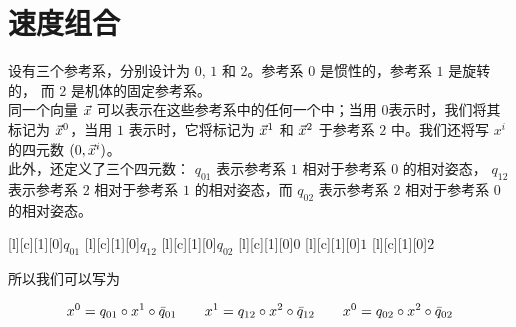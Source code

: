%
%


%

%

%

%





\section{速度组合}
\label{SpeedComposition}


设有三个参考系，分别设计为 $0$, $1$ 和 $2$。参考系 $0$ 是惯性的，参考系 $1$ 是旋转的， 而 $2$ 是机体的固定参考系。\\
同一个向量 $\vec{x}$ 可以表示在这些参考系中的任何一个中；当用 $0$表示时，我们将其标记为 $\vec{x}^0$，当用 $1$ 表示时，它将标记为 $\vec{x}^1$ 和 $\vec{x}^2$ 于参考系 $2$ 中。我们还将写 $x^i$ 的四元数 $(0,\vec{x}^i)$。\\
此外，还定义了三个四元数： $q_{01}$ 表示参考系 $1$ 相对于参考系 $0$ 的相对姿态， $q_{12}$ 表示参考系 $2$ 相对于参考系 $1$ 的相对姿态，而 $q_{02}$ 表示参考系 $2$ 相对于参考系 $0$的相对姿态。\\


\begin{center}
[l][c][1][0]{$q_{01}$}
[l][c][1][0]{$q_{12}$}
[l][c][1][0]{$q_{02}$}
[l][c][1][0]{$0$}
[l][c][1][0]{$1$}
[l][c][1][0]{$2$}
\end{center}


所以我们可以写为

\begin{equation*}
x^0=q_{01} \circ x^1 \circ \bar{q}_{01}   \qquad   x^1=q_{12} \circ x^2 \circ \bar{q}_{12} \qquad    x^0=q_{02} \circ x^2 \circ \bar{q}_{02}
\end{equation*}

